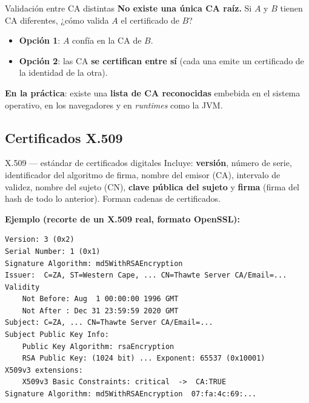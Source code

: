 \documentclass[11pt,a4paper]{article}
\begin{document}
\begin{defbox}{Validación entre CA distintas}
\textbf{No existe una única CA raíz.} Si $A$ y $B$ tienen CA diferentes, ¿cómo valida $A$ el
certificado de $B$?
\begin{itemize}[leftmargin=1.4em,itemsep=1pt]
  \item \textbf{Opción 1}: $A$ confía en la CA de $B$.
  \item \textbf{Opción 2}: las CA \textbf{se certifican entre sí} (cada una emite un
        certificado de la identidad de la otra).
\end{itemize}
\textbf{En la práctica}: existe una \textbf{lista de CA reconocidas} embebida en el sistema
operativo, en los navegadores y en \emph{runtimes} como la JVM.
\end{defbox}

\subsection{Certificados X.509}

\begin{defbox}{X.509 — estándar de certificados digitales}
Incluye: \textbf{versión}, número de serie, identificador del algoritmo de firma, nombre del
emisor (CA), intervalo de validez, nombre del sujeto (CN), \textbf{clave pública del sujeto} y
\textbf{firma} (firma del hash de todo lo anterior). Forman cadenas de certificados.
\end{defbox}

\begin{slidebox}
\textbf{Ejemplo (recorte de un X.509 real, formato OpenSSL):}
\begin{lstlisting}[style=shell]
Version: 3 (0x2)
Serial Number: 1 (0x1)
Signature Algorithm: md5WithRSAEncryption
Issuer:  C=ZA, ST=Western Cape, ... CN=Thawte Server CA/Email=...
Validity
    Not Before: Aug  1 00:00:00 1996 GMT
    Not After : Dec 31 23:59:59 2020 GMT
Subject: C=ZA, ... CN=Thawte Server CA/Email=...
Subject Public Key Info:
    Public Key Algorithm: rsaEncryption
    RSA Public Key: (1024 bit) ... Exponent: 65537 (0x10001)
X509v3 extensions:
    X509v3 Basic Constraints: critical  ->  CA:TRUE
Signature Algorithm: md5WithRSAEncryption  07:fa:4c:69:...
\end{lstlisting}
\end{slidebox}
\end{document}
